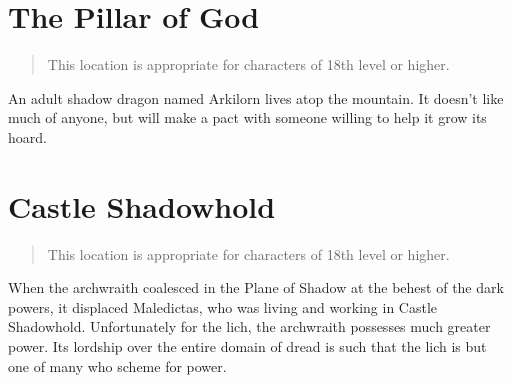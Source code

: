 \section{The Pillar of God} \label{loc:pillarofgod}

\begin{quote}
  This location is appropriate for characters of 18th level or higher.
\end{quote}

An adult shadow dragon named Arkilorn lives atop the mountain. It doesn't like
much of anyone, but will make a pact with someone willing to help it grow its hoard.

\section{Castle Shadowhold} \label{loc:shadowhold}

\begin{quote}
  This location is appropriate for characters of 18th level or higher.
\end{quote}

When the archwraith coalesced in the Plane of Shadow at the behest of the dark powers,
it displaced Maledictas, who was living and working in Castle Shadowhold. Unfortunately
for the lich, the archwraith possesses much greater power. Its lordship over the
entire domain of dread is such that the lich is but one of many who scheme for power.
